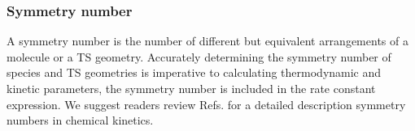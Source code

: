\documentclass[preprint, 11pt]{elsarticle} %
\begin{document}
\subsubsection{Symmetry number}

A symmetry number is the number of different but equivalent arrangements of a molecule or a TS geometry.
Accurately determining the symmetry number of species and TS geometries is imperative to calculating thermodynamic and kinetic parameters, the symmetry number is included in the rate constant expression. 
We suggest readers review Refs. \cite{FernandezRamos:2007, Pollak:1978} for a detailed description symmetry numbers in chemical kinetics.

\end{document}
